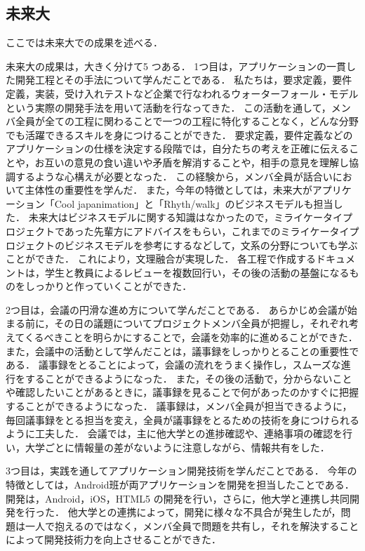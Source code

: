 \subsection{未来大}
\par
ここでは未来大での成果を述べる．
\par
未来大の成果は，大きく分けて5 つある．
1つ目は，アプリケーションの一貫した開発工程とその手法について学んだことである．
私たちは，要求定義，要件定義，実装，受け入れテストなど企業で行なわれるウォーターフォール・モデルという実際の開発手法を用いて活動を行なってきた．
この活動を通して，メンバ全員が全ての工程に関わることで一つの工程に特化することなく，どんな分野でも活躍できるスキルを身につけることができた．
要求定義，要件定義などのアプリケーションの仕様を決定する段階では，自分たちの考えを正確に伝えることや，お互いの意見の食い違いや矛盾を解消することや，相手の意見を理解し協調するような心構えが必要となった．
この経験から，メンバ全員が話合いにおいて主体性の重要性を学んだ．
また，今年の特徴としては，未来大がアプリケーション「Cool japanimation」と「Rhyth/walk」のビジネスモデルも担当した．
未来大はビジネスモデルに関する知識はなかったので，ミライケータイプロジェクトであった先輩方にアドバイスをもらい，これまでのミライケータイプロジェクトのビジネスモデルを参考にするなどして，文系の分野についても学ぶことができた．
これにより，文理融合が実現した．
各工程で作成するドキュメントは，学生と教員によるレビューを複数回行い，その後の活動の基盤になるものをしっかりと作っていくことができた．
\par
2つ目は，会議の円滑な進め方について学んだことである．
あらかじめ会議が始まる前に，その日の議題についてプロジェクトメンバ全員が把握し，それぞれ考えてくるべきことを明らかにすることで，会議を効率的に進めることができた．
また，会議中の活動として学んだことは，議事録をしっかりとることの重要性である．
議事録をとることによって，会議の流れをうまく操作し，スムーズな進行をすることができるようになった．
また，その後の活動で，分からないことや確認したいことがあるときに，議事録を見ることで何があったのかすぐに把握することができるようになった．
議事録は，メンバ全員が担当できるように，毎回議事録をとる担当を変え，全員が議事録をとるための技術を身につけられるように工夫した．
会議では，主に他大学との進捗確認や、連絡事項の確認を行い，大学ごとに情報量の差がないように注意しながら、情報共有をした．
\par
3つ目は，実践を通してアプリケーション開発技術を学んだことである．
今年の特徴としては，Android班が両アプリケーションを開発を担当したことである．
開発は，Android，iOS，HTML5 の開発を行い，さらに，他大学と連携し共同開発を行った．
他大学との連携によって，開発に様々な不具合が発生したが，問題は一人で抱えるのではなく，メンバ全員で問題を共有し，それを解決することによって開発技術力を向上させることができた．
